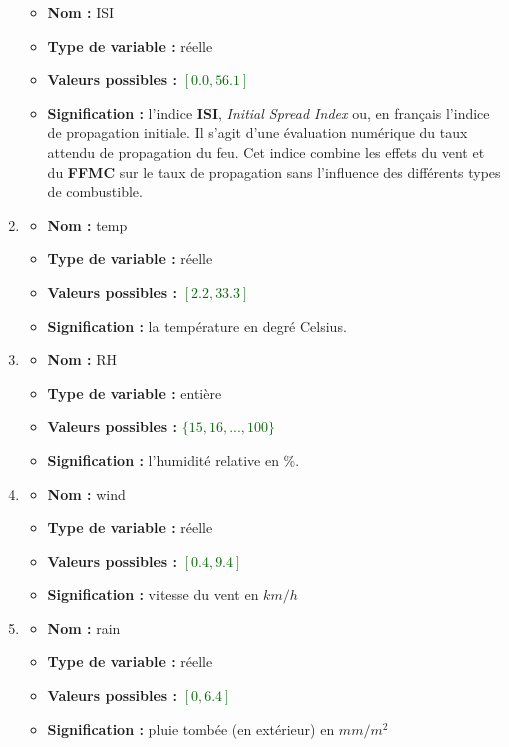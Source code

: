 \documentclass{article}
\newcommand{\titre}[1]{\textcolor{title}{#1}}
\newcommand{\gre}[1]{\textcolor{darkgreen}{#1}}
\begin{document}
\begin{sffamily}
\begin{enumerate}
\begin{itemize}
	\item \textbf{Nom : }\titre{ISI}
	\item \textbf{Type de variable : }réelle
	\item \textbf{Valeurs possibles : }\gre{$[0.0,56.1]$}
	\item \textbf{Signification : }l'indice \textbf{ISI}, \textit{Initial Spread Index} ou, en français l'indice de propagation
	initiale. Il s'agit d'une évaluation numérique du taux attendu de propagation du feu. Cet indice combine les effets du vent
	et du \textbf{FFMC} sur le taux de propagation sans l'influence des différents types de combustible.
\end{itemize}
\item \begin{itemize}
	\item \textbf{Nom : }\titre{temp}
	\item \textbf{Type de variable : }réelle
	\item \textbf{Valeurs possibles : }\gre{$[2.2,33.3]$}
	\item \textbf{Signification : }la température en degré Celsius.
\end{itemize}
\item \begin{itemize}
	\item \textbf{Nom : }\titre{RH}
	\item \textbf{Type de variable : }entière
	\item \textbf{Valeurs possibles : }\gre{$\{15,16,...,100\}$}
	\item \textbf{Signification : }l'humidité relative en \%.
\end{itemize}
\item \begin{itemize}
	\item \textbf{Nom : }\titre{wind}
	\item \textbf{Type de variable : }réelle
	\item \textbf{Valeurs possibles : }\gre{$[0.4,9.4]$}
	\item \textbf{Signification : }vitesse du vent en $km/h$
\end{itemize}
\item \begin{itemize}
	\item \textbf{Nom : }\titre{rain}
	\item \textbf{Type de variable : }réelle
	\item \textbf{Valeurs possibles : }\gre{$[0,6.4]$}
	\item \textbf{Signification : }pluie tombée (en extérieur) en $mm/m^2$

\end{itemize}
\end{enumerate}
\end{sffamily}
\end{document}
